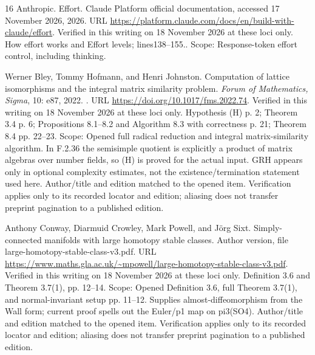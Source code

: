 \documentclass[11pt,a4paper]{article}
\theoremstyle{definition}
\begin{document}
\begin{thebibliography}{16}
{Anthropic}.
\newblock Effort.
\newblock Claude Platform official documentation, accessed 17 November 2026,
  2026.
\newblock URL
  \url{https://platform.claude.com/docs/en/build-with-claude/effort}.
\newblock Verified in this writing on 18 November 2026 at these loci only. How
  effort works and Effort levels;\allowbreak{} lines138–155.. Scope: Response-token effort
  control, including thinking.

Werner Bley, Tommy Hofmann, and Henri Johnston.
\newblock Computation of lattice isomorphisms and the integral matrix
  similarity problem.
\newblock \emph{Forum of Mathematics, Sigma}, 10: e87, 2022.
\newblock {}.
\newblock URL \url{https://doi.org/10.1017/fms.2022.74}.
\newblock Verified in this writing on 18 November 2026 at these loci only.
  Hypothesis (H) p. 2;\allowbreak{} Theorem 3.4 p. 6;\allowbreak{} Propositions 8.1–8.2 and Algorithm
  8.3 with correctness p. 21;\allowbreak{} Theorem 8.4 pp. 22–23. Scope: Opened full
  radical reduction and integral matrix-similarity algorithm. In F.2.36 the
  semisimple quotient is explicitly a product of matrix algebras over number
  fields, so (H) is proved for the actual input. GRH appears only in optional
  complexity estimates, not the existence/termination statement used here.
  Author/title and edition matched to the opened item. Verification applies
  only to its recorded locator and edition;\allowbreak{} aliasing does not transfer preprint
  pagination to a published edition.

Anthony Conway, Diarmuid Crowley, Mark Powell, and J{\"o}rg Sixt.
\newblock Simply-connected manifolds with large homotopy stable classes.
\newblock Author version, file large-homotopy-stable-class-v3.pdf.
\newblock URL
  \url{https://www.maths.gla.ac.uk/~mpowell/large-homotopy-stable-class-v3.pdf}.
\newblock Verified in this writing on 18 November 2026 at these loci only.
  Definition 3.6 and Theorem 3.7(1), pp. 12–14. Scope: Opened Definition 3.6,
  full Theorem 3.7(1), and normal-invariant setup pp. 11–12. Supplies
  almost-diffeomorphism from the Wall form;\allowbreak{} current proof spells out the
  Euler/p1 map on pi3(SO4). Author/title and edition matched to the opened
  item. Verification applies only to its recorded locator and edition;\allowbreak{} aliasing
  does not transfer preprint pagination to a published edition.


\end{thebibliography}
\end{document}
